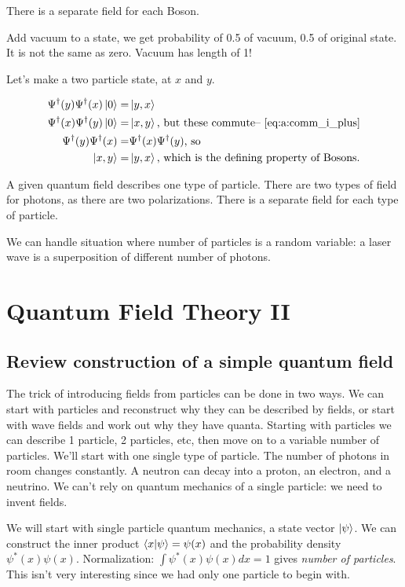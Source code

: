 \documentclass[]{article}
\begin{document}
There is a separate field for each Boson.

Add vacuum to a state, we get probability of 0.5 of vacuum, 0.5 of original state. It is not the same as zero. Vacuum has length of 1!

Let's make a two particle state, at $x$ and $y$. 
 
\begin{align*}
	\Psi^\dagger(y)\Psi^\dagger(x)\ket{0} =& \ket{y,x}\\
	\Psi^\dagger(x)\Psi^\dagger(y)\ket{0} =& \ket{x,y} \text{, but these commute-- \eqref {eq:a:comm_i_plus}}\\
	\Psi^\dagger(y)\Psi^\dagger(x) =& \Psi^\dagger(x)\Psi^\dagger(y) \text{, so}\\
	\ket{x,y} =& \ket{y,x} \text{, which is the defining property of Bosons.} 
\end{align*}

A given quantum field describes one type of particle. There are two types of field for photons, as there are two polarizations. There is a separate field for each type of particle.

We can handle situation where number of particles is a random variable: a laser wave is a superposition of different number of photons.

\section{Quantum Field Theory II}

\subsection{Review construction of a simple quantum field}

The trick of introducing fields from particles can be done in two ways. We can start with particles and reconstruct why they can be described by fields, or start with wave fields and work out why they have quanta. Starting with particles we can describe 1 particle, 2 particles, etc, then move on to a variable number of particles. We'll start with one single type of particle. The number of photons in room changes constantly. A neutron can decay into a proton, an electron, and a neutrino. We can't rely on quantum mechanics of a single particle: we need to invent fields.

We will start with single particle quantum mechanics, a state vector $\ket{\psi}$. We can construct the inner product $\braket{x|\psi}=\psi(x)$ and the probability density $\psi^*(x) \psi(x)$.  Normalization: $\int \psi^*(x) \psi(x) dx=1$ gives \textit{number of particles}. This isn't very interesting since we had only one particle to begin with.
\end{document}
